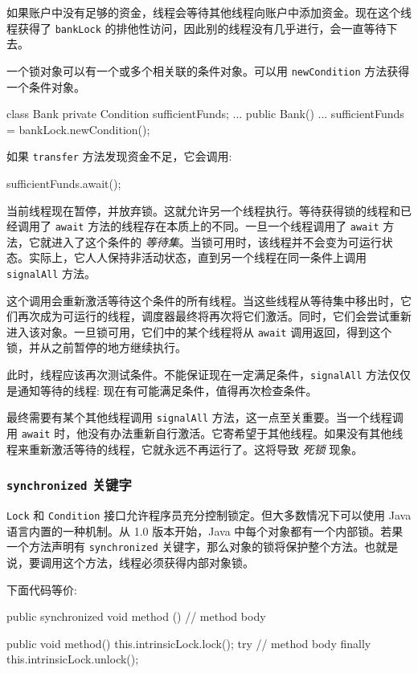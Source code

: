 如果账户中没有足够的资金，线程会等待其他线程向账户中添加资金。现在这个线程获得了 \texttt{bankLock} 的排他性访问，因此别的线程没有几乎进行，会一直等待下去。

一个锁对象可以有一个或多个相关联的条件对象。可以用 \texttt{newCondition} 方法获得一个条件对象。

\begin{Java}
class Bank {
    private Condition sufficientFunds;
    ...
    public Bank() {
        ...
        sufficientFunds = bankLock.newCondition();
    }
}
\end{Java}

如果 \texttt{transfer} 方法发现资金不足，它会调用:

\begin{Java}
sufficientFunds.await();
\end{Java}

当前线程现在暂停，并放弃锁。这就允许另一个线程执行。等待获得锁的线程和已经调用了 \texttt{await} 方法的线程存在本质上的不同。一旦一个线程调用了 \texttt{await} 方法，它就进入了这个条件的 \textit{等待集}。当锁可用时，该线程并不会变为可运行状态。实际上，它人人保持非活动状态，直到另一个线程在同一条件上调用 \texttt{signalAll} 方法。

这个调用会重新激活等待这个条件的所有线程。当这些线程从等待集中移出时，它们再次成为可运行的线程，调度器最终将再次将它们激活。同时，它们会尝试重新进入该对象。一旦锁可用，它们中的某个线程将从 \texttt{await} 调用返回，得到这个锁，并从之前暂停的地方继续执行。

此时，线程应该再次测试条件。不能保证现在一定满足条件，\texttt{signalAll} 方法仅仅是通知等待的线程: 现在有可能满足条件，值得再次检查条件。

最终需要有某个其他线程调用 \texttt{signalAll} 方法，这一点至关重要。当一个线程调用 \texttt{await} 时，他没有办法重新自行激活。它寄希望于其他线程。如果没有其他线程来重新激活等待的线程，它就永远不再运行了。这将导致 \textit{死锁} 现象。

\subsubsection{\texttt{synchronized} 关键字}

\texttt{Lock} 和 \texttt{Condition} 接口允许程序员充分控制锁定。但大多数情况下可以使用 Java 语言内置的一种机制。从 1.0 版本开始，Java 中每个对象都有一个内部锁。若果一个方法声明有 \texttt{synchronized} 关键字，那么对象的锁将保护整个方法。也就是说，要调用这个方法，线程必须获得内部对象锁。

下面代码等价:
\begin{Java}
public synchronized void method () {
    // method body
}

public void method() {
    this.intrinsicLock.lock();
    try {
        // method body
    } finally {
        this.intrinsicLock.unlock();
    }
}
\end{Java}

